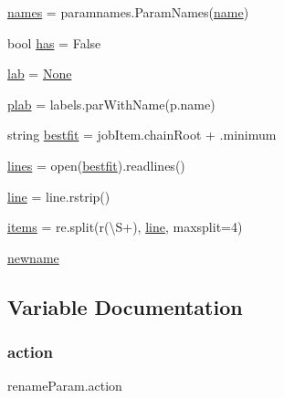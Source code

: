 \begin{DoxyCompactItemize}
\item 
\mbox{\hyperlink{namespacerenameParam_a8ac93008b7bd0e3c351e377bfcc17a37}{names}} = paramnames.\+Param\+Names(\mbox{\hyperlink{namespacerenameParam_acc5239392b836c3740beccfcf6245fc6}{name}})
\item 
bool \mbox{\hyperlink{namespacerenameParam_a7c337d728fad268efd57609f263d3a21}{has}} = False
\item 
\mbox{\hyperlink{namespacerenameParam_af29158edeacfd4881014a4f05c9b8793}{lab}} = \mbox{\hyperlink{namespacerenameParam_afe927de0e02c7767f643ec6c1d857c67}{None}}
\item 
\mbox{\hyperlink{namespacerenameParam_a9bbf2dcce964e369b659ffe2a93885a2}{plab}} = labels.\+par\+With\+Name(p.\+name)
\item 
string \mbox{\hyperlink{namespacerenameParam_a8f5657f015d113430e3313bdd6bde48f}{bestfit}} = job\+Item.\+chain\+Root + \textquotesingle{}.minimum\textquotesingle{}
\item 
\mbox{\hyperlink{namespacerenameParam_af767304ff4d8866a704dc832fc4c48e4}{lines}} = open(\mbox{\hyperlink{namespacerenameParam_a8f5657f015d113430e3313bdd6bde48f}{bestfit}}).readlines()
\item 
\mbox{\hyperlink{namespacerenameParam_a1514d9e517c3a09886531e48e75d5bfe}{line}} = line.\+rstrip()
\item 
\mbox{\hyperlink{namespacerenameParam_aab9cfaad73b8ced0181388570b9d9be9}{items}} = re.\+split(r\textquotesingle{}(\textbackslash{}S+)\textquotesingle{}, \mbox{\hyperlink{namespacerenameParam_a1514d9e517c3a09886531e48e75d5bfe}{line}}, maxsplit=4)
\item 
\mbox{\hyperlink{namespacerenameParam_a4e1674dbee1d144bba77bc9050b26e4d}{newname}}
\end{DoxyCompactItemize}


\subsection{Variable Documentation}
\mbox{\label{namespacerenameParam_a5ca1595c439d776ab386e616b1b572ac}} 
\subsubsection{\texorpdfstring{action}{action}}
{\footnotesize\ttfamily rename\+Param.\+action}

